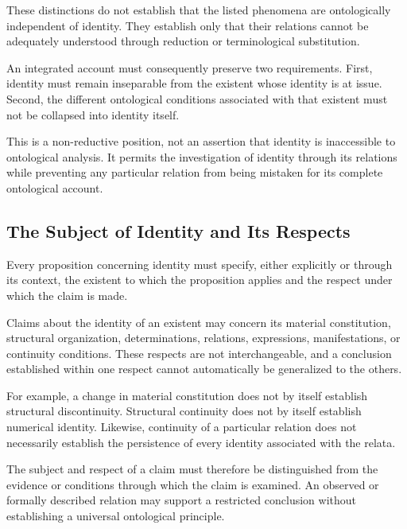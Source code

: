 These distinctions do not establish that the listed
phenomena are ontologically independent of identity.
They establish only that their relations cannot be
adequately understood through reduction or terminological
substitution.

An integrated account must consequently preserve two
requirements. First, identity must remain inseparable from
the existent whose identity is at issue. Second, the
different ontological conditions associated with that
existent must not be collapsed into identity itself.

This is a non-reductive position, not an assertion that
identity is inaccessible to ontological analysis. It permits
the investigation of identity through its relations while
preventing any particular relation from being mistaken
for its complete ontological account.


\subsection{The Subject of Identity and Its Respects}

Every proposition concerning identity must specify, either
explicitly or through its context, the existent to which
the proposition applies and the respect under which the
claim is made.

Claims about the identity of an existent may concern its
material constitution, structural organization, determinations,
relations, expressions, manifestations, or continuity
conditions. These respects are not interchangeable, and
a conclusion established within one respect cannot
automatically be generalized to the others.

For example, a change in material constitution does not
by itself establish structural discontinuity. Structural
continuity does not by itself establish numerical identity.
Likewise, continuity of a particular relation does not
necessarily establish the persistence of every identity
associated with the relata.

The subject and respect of a claim must therefore be
distinguished from the evidence or conditions through
which the claim is examined. An observed or formally
described relation may support a restricted conclusion
without establishing a universal ontological principle.

